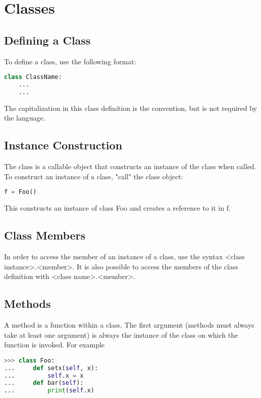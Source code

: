 \section{Classes}
\subsection{Defining a Class}
To define a class, use the following format:
\lstset{basicstyle=\scriptsize, numbers=left, captionpos=b, tabsize=4}
\begin{lstlisting}[caption=Class Definition,language={Python},
xleftmargin=15pt, label=lst:classdefinition]
class ClassName:
    ...
    ...
\end{lstlisting}

The capitalization in this class definition is the convention, but is not
required by the language.

\subsection{Instance Construction}
The class is a callable object that constructs an instance of the class when
called. To construct an instance of a class, "call" the class object:
\lstset{basicstyle=\scriptsize, numbers=left, captionpos=b, tabsize=4}
\begin{lstlisting}[caption=Instancing a Class,language={Python},
xleftmargin=15pt, label=lst:instancingaclass]
f = Foo()
\end{lstlisting}

This constructs an instance of class Foo and creates a reference to it in f.

\subsection{Class Members}
In order to access the member of an instance of a class, use the syntax <class
instance>.<member>. It is also possible to access the members of the class
definition with <class name>.<member>.

\subsection{Methods}
A method is a function within a class. The first argument (methods must always
take at least one argument) is always the instance of the class on which the
function is invoked. For example
\lstset{basicstyle=\scriptsize, numbers=left, captionpos=b, tabsize=4}
\begin{lstlisting}[caption=Defining member Functions,language={Python},
xleftmargin=15pt, label=lst:definigmemberfunctions]
>>> class Foo:
...     def setx(self, x):
...         self.x = x
...     def bar(self):
...         print(self.x)
\end{lstlisting}

